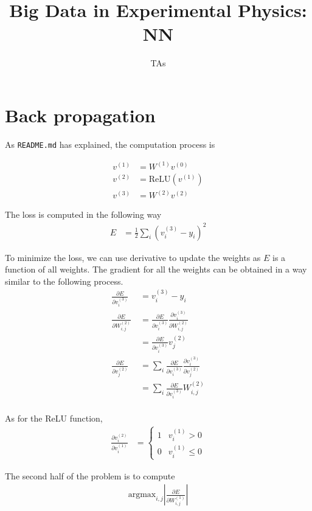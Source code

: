 \documentclass{article}
\title{\textbf{Big Data in Experimental Physics: NN}}
\author{TAs}
\begin{document}
\maketitle

\section{Back propagation}

As \texttt{README.md} has explained, the computation process is

\begin{align*}
  v^{(1)}&=W^{(1)}v^{(0)}\\
  v^{(2)}&=\text{ReLU}(v^{(1)})\\
  v^{(3)}&=W^{(2)}v^{(2)}
\end{align*}

The loss is computed in the following way
\begin{align*}
  E&=\frac{1}{2}\sum_{i}(v^{(3)}_i-y_i)^2
\end{align*}

\newcommand{\pfrac}[2]{\frac{\partial #1}{\partial #2}}

To minimize the loss, we can use derivative to update the weights as $E$ is a function of all weights. The gradient for all the weights can be obtained in a way similar to the following process.
\begin{align*}
  \pfrac{E}{v^{(3)}_i}&=v^{(3)}_i-y_i\\
  \pfrac{E}{W^{(2)}_{i,j}}\
  &=\pfrac{E}{v^{(3)}_i}\pfrac{v^{(3)}_i}{W^{(2)}_{i,j}}\\
  &=\pfrac{E}{v^{(3)}_i}v^{(2)}_j\\
  \pfrac{E}{v^{(2)}_j}
  &=\sum_i\pfrac{E}{v^{(3)}_i}\pfrac{v^{(3)}_i}{v^{(2)}_{j}}\\
  &=\sum_i\pfrac{E}{v^{(3)}_i}W^{(2)}_{i,j}\\
\end{align*}

As for the ReLU function,
\begin{align*}
  \pfrac{v^{(2)}_i}{v^{(1)}_i}
  &=\left\{
    \begin{array}{ll}
      1 & v^{(1)}_i>0\\
      0 & v^{(1)}_i\leq 0
    \end{array}
    \right.
\end{align*}

The second half of the problem is to compute
\begin{align*}
  \text{argmax}_{i,j}\left|\pfrac{E}{W^{(1)}_{i,j}}\right|
\end{align*}
\end{document}
